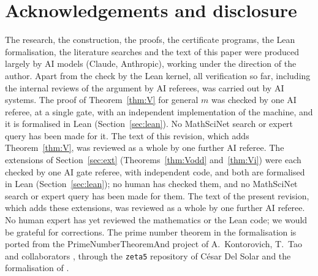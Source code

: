 \documentclass[11pt]{amsart}
\theoremstyle{definition}
\theoremstyle{remark}
\numberwithin{equation}{section}
\newcommand{\lean}[1]{{\def\_{\textunderscore\allowbreak}\texttt{#1}}}
\begin{document}
\section*{Acknowledgements and disclosure}
The research, the construction, the proofs, the certificate programs, the Lean formalisation, the literature searches and
the text of this paper were produced largely by AI models (Claude, Anthropic), working under the direction of the author.
Apart from the check by the Lean kernel, all verification so far, including the internal reviews of the argument by AI
referees, was carried out by AI systems. The proof of Theorem~\ref{thm:V} for general $m$ was checked by one AI referee,
at a single gate, with an independent implementation of the machine, and it is formalised in Lean
(Section~\ref{sec:lean}). No MathSciNet search or expert query has been made for it. The text of this revision, which
adds Theorem~\ref{thm:V}, was reviewed as a whole by one further AI referee. The extensions of Section~\ref{sec:ext}
(Theorems~\ref{thm:Vodd} and~\ref{thm:Vi}) were each checked by one AI gate referee, with independent code, and both
are formalised in Lean (Section~\ref{sec:lean}); no human has checked them, and no MathSciNet search or expert query has been made for them. The text of the
present revision, which adds these extensions, was reviewed as a whole by one further AI referee. No human expert has yet reviewed the mathematics or the Lean code; we would be grateful for corrections. The
prime number theorem in the formalisation is ported from the PrimeNumberTheoremAnd project of A.~Kontorovich, T.~Tao and
collaborators \cite{PNTplus}, through the \lean{zeta5} repository of C\'esar Del Solar \cite{zeta5} and the formalisation
of \cite{Chi2Paper}.



\end{document}
